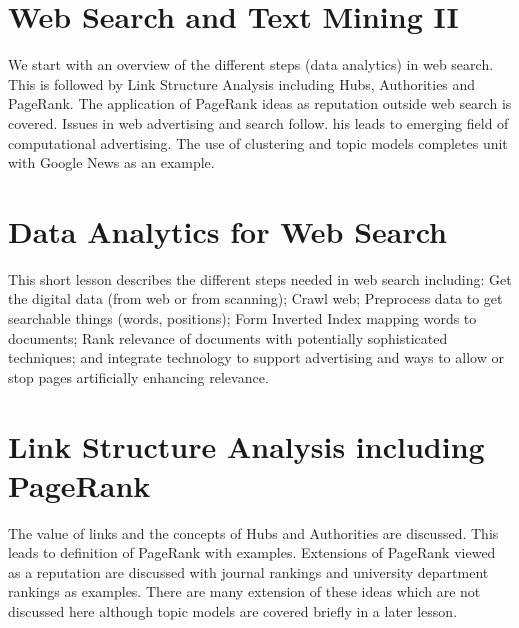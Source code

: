 \section{Web Search and Text Mining
II}\label{web-search-and-text-mining-ii}


We start with an overview of the different steps (data analytics) in web
search. This is followed by Link Structure Analysis including Hubs,
Authorities and PageRank. The application of PageRank ideas as
reputation outside web search is covered. Issues in web advertising and
search follow. his leads to emerging field of computational advertising.
The use of clustering and topic models completes unit with Google News
as an example.



\section{Data Analytics for Web Search}\label{data-analytics-for-web-search}


This short lesson describes the different steps needed in web search
including: Get the digital data (from web or from scanning); Crawl web;
Preprocess data to get searchable things (words, positions); Form
Inverted Index mapping words to documents; Rank relevance of documents
with potentially sophisticated techniques; and integrate technology to
support advertising and ways to allow or stop pages artificially
enhancing relevance.




\section{Link Structure Analysis including PageRank}\label{link-structure-analysis-including-pagerank}


The value of links and the concepts of Hubs and Authorities are
discussed. This leads to definition of PageRank with examples.
Extensions of PageRank viewed as a reputation are discussed with journal
rankings and university department rankings as examples. There are many
extension of these ideas which are not discussed here although topic
models are covered briefly in a later lesson.



